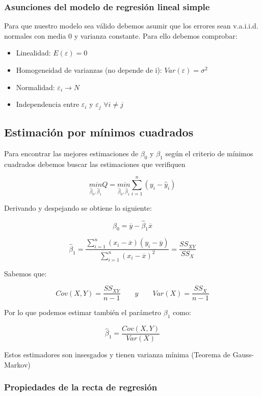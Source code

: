 \subsubsection{Asunciones del modelo de regresión lineal simple}

Para que nuestro modelo sea válido debemos asumir que los errores sean v.a.i.i.d. normales con media 0 y varianza constante. Para ello debemos comprobar:
\begin{itemize}
    \item Linealidad: $E(\varepsilon)=0$
    \item Homogeneidad de varianzas (no depende de i): $Var(\varepsilon)=\sigma^2$
    \item Normalidad: $\varepsilon_i\rightarrow N$
    \item Independencia entre $\varepsilon_i$ y $\varepsilon_j$ $\forall i\neq j$
\end{itemize}

\subsection{Estimación por mínimos cuadrados}

Para encontrar las mejores estimaciones de $\beta_0$ y $\beta_1$ según el criterio de mínimos cuadrados debemos buscar las estimaciones que verifiquen

$$
\underset{\hat\beta_0,\hat\beta_1}{min} Q = \underset{\hat\beta_0,\hat\beta_1}{min} \sum_{i=1}^{n}(y_i-\hat y_i)
$$

Derivando y despejando se obtiene lo siguiente:

$$
\hat\beta_0=\overline{y}-\hat\beta_1\overline{x}
$$

$$
\hat\beta_1=\frac{\displaystyle\sum_{i=1}^{n}(x_i-\overline{x})(y_i-\overline{y})}{\displaystyle\sum_{i=1}^{n}(x_i-\overline{x})^2}=\frac{SS_{XY}}{SS_X}
$$

Sabemos que: 

$$
Cov(X,Y)=\frac{SS_{XY}}{n-1}\quad\quad y \quad\quad Var(X)=\frac{SS_{X}}{n-1}
$$

Por lo que podemos estimar también el parámetro $\beta_1$ como:

$$
\hat\beta_1=\frac{Cov(X,Y)}{Var(X)}
$$

Estos estimadores son insesgados y tienen varianza mínima (Teorema de Gauss-Markov)

\subsubsection{Propiedades de la recta de regresión}

